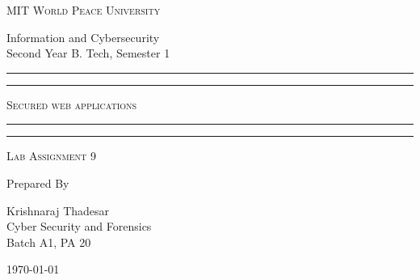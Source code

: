\documentclass[11pt]{article}
\begin{document}
\begin{titlepage}
    \centering


    \huge\textsc{
        MIT World Peace University
    }\\

    \vspace{0.75\baselineskip} %

    \LARGE{
        Information and Cybersecurity\\
        Second Year B. Tech, Semester 1
    }

    \vfill %


    \rule{\textwidth}{1.6pt}\vspace*{-\baselineskip}\vspace*{2pt}
    \rule{\textwidth}{0.6pt}
    \vspace{0.75\baselineskip} %



    \huge{\textsc{
            Secured web applications
        }} \\



    \vspace{0.5\baselineskip} %
    \rule{\textwidth}{0.6pt}\vspace*{-\baselineskip}\vspace*{2.8pt}
    \rule{\textwidth}{1.6pt}

    \vspace{1\baselineskip} %


    \LARGE\textsc{
        Lab Assignment 9
    } %
    \vfill


    Prepared By
    \vspace{0.5\baselineskip} %

    \Large{
        Krishnaraj Thadesar \\
        Cyber Security and Forensics\\
        Batch A1, PA 20
    }


    \vspace{0.5\baselineskip} %
    \today

\end{titlepage}
\end{document}
